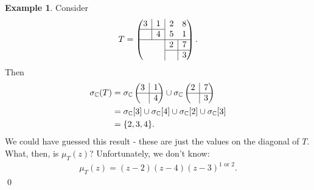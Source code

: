 \documentclass{book}
\theoremstyle{definition}
\newtheorem{exmp}{Example}[section]
\newcommand{\rvline}{\hspace*{-\arraycolsep}\vline\hspace*{-\arraycolsep}}
\begin{document}
\begin{exmp}
	Consider 
	\begin{align*}
	T = 
	\begin{pmatrix}
	\begin{matrix}
	3 & \rvline & 1\\
	\hline
	& \rvline & 4
	\end{matrix} 
	& \rvline &
	\begin{matrix}
	2 & 8 \\
	5 & 1
	\end{matrix}\\
	\hline
	&\rvline & 
	\begin{matrix}
	2 & \rvline & 7\\
	\hline
	& \rvline & 3
	\end{matrix}
	\end{pmatrix}.
	\end{align*}
	Then
	\begin{align*}
	\sigma_{\mathbb{C}}(T) 
	&= \sigma_{\mathbb{C}}
	\begin{pmatrix}
	3 & \rvline & 1\\
	\hline
	& \rvline & 4
	\end{pmatrix}  
	\cup
	\sigma_{\mathbb{C}}  
	\begin{pmatrix}
	2 & \rvline & 7\\
	\hline
	& \rvline & 3
	\end{pmatrix} \\
	&= \sigma_{\mathbb{C}}[3] \cup \sigma_{\mathbb{C}}[4] \cup \sigma_{\mathbb{C}}[2] \cup \sigma_{\mathbb{C}}[3]\\
	&= \{ 2,3,4 \}.    
	\end{align*}
	We could have guessed this result - these are just the values on the diagonal of $T$. What, then, is $\mu_T(z)$? Unfortunately, we don't know:
	\begin{align*}
	\mu_T(z) = (z-2)(z-4)(z-3)^{1\text{ or }2}.
	\end{align*}\qed
\end{exmp}
\end{document}
